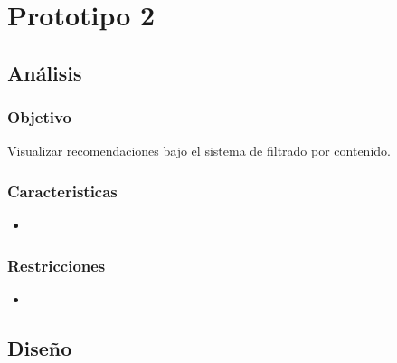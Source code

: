 \chapter{Prototipo 2}
  \section{Análisis}
    \subsection{Objetivo}
      Visualizar recomendaciones bajo el sistema de filtrado por contenido. 
    \subsection{Caracteristicas}
    \begin{itemize}
      \item
    \end{itemize}

    \subsection{Restricciones}
    \begin{itemize}
      \item
    \end{itemize}

  \section{Diseño}


